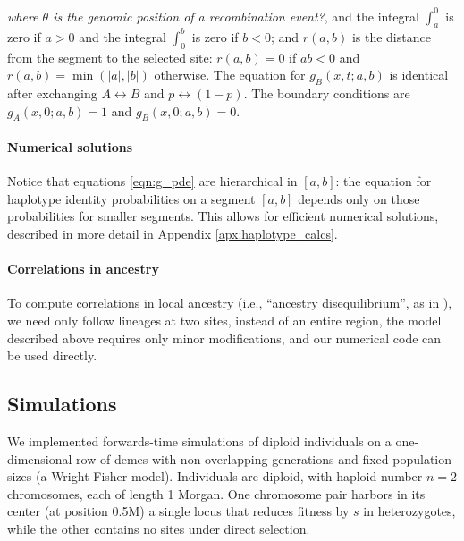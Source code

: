 \documentclass[12pt]{article}
\newcommand{\alisa}[1]{{\em \color{red} #1}}
\begin{document}
\alisa{where $\theta$ is the genomic position of a recombination event?}, and the integral $\int_a^0$ is zero if $a>0$ and the integral $\int_0^b$ is zero if $b<0$;
and $r(a,b)$ is the distance from the segment to the selected site:
$r(a,b)=0$ if $ab<0$ and $r(a,b)=\min(|a|,|b|)$ otherwise.
The equation for $g_B(x,t;a,b)$ is identical after exchanging $A \leftrightarrow B$ and
$p \leftrightarrow (1-p)$.
The boundary conditions are $g_A(x,0;a,b)=1$ and $g_B(x,0;a,b)=0$.

\paragraph{Numerical solutions}
Notice that equations \eqref{eqn:g_pde}
are hierarchical in $[a,b]$:
the equation for haplotype identity probabilities on a segment $[a,b]$ depends only on those probabilities for smaller segments.
This allows for efficient numerical solutions,
described in more detail in Appendix \ref{apx:haplotype_calcs}.


\paragraph{Correlations in ancestry}
To compute correlations in local ancestry
(i.e., ``ancestry disequilibrium'', as in \citet{Pool2015,Schumer2016}),
we need only follow lineages at two sites, instead of an entire region,
the model described above requires only minor modifications,
and our numerical code can be used directly.


\subsection*{Simulations}

We implemented forwards-time simulations of diploid individuals on a one-dimensional row of demes
with non-overlapping generations and fixed population sizes (a Wright-Fisher model). Individuals are diploid, with haploid number $n=2$ chromosomes, each of length 1 Morgan. One chromosome pair harbors in its center (at position 0.5M) a single locus that reduces fitness by $s$ in heterozygotes, while the other contains no sites under direct selection.
\end{document}
